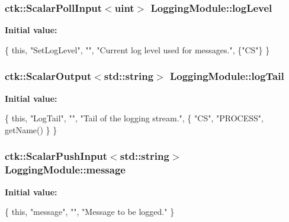 \subsubsection[{\texorpdfstring{log\+Level}{logLevel}}]{\setlength{\rightskip}{0pt plus 5cm}ctk\+::\+Scalar\+Poll\+Input$<$uint$>$ Logging\+Module\+::log\+Level}\hypertarget{structLoggingModule_a73312a5a93ca0d7ef9e90c02c3dd33b4}{}\label{structLoggingModule_a73312a5a93ca0d7ef9e90c02c3dd33b4}
{\bfseries Initial value\+:}
\begin{DoxyCode}
\{ \textcolor{keyword}{this}, \textcolor{stringliteral}{"SetLogLevel"}, \textcolor{stringliteral}{""},
      \textcolor{stringliteral}{"Current log level used for messages."}, \{\textcolor{stringliteral}{"CS"}\} \}
\end{DoxyCode}
\subsubsection[{\texorpdfstring{log\+Tail}{logTail}}]{\setlength{\rightskip}{0pt plus 5cm}ctk\+::\+Scalar\+Output$<$std\+::string$>$ Logging\+Module\+::log\+Tail}\hypertarget{structLoggingModule_a454442d06a719179e5719978d5ca26d4}{}\label{structLoggingModule_a454442d06a719179e5719978d5ca26d4}
{\bfseries Initial value\+:}
\begin{DoxyCode}
\{ \textcolor{keyword}{this}, \textcolor{stringliteral}{"LogTail"}, \textcolor{stringliteral}{""}, \textcolor{stringliteral}{"Tail of the logging stream."},
      \{ \textcolor{stringliteral}{"CS"}, \textcolor{stringliteral}{"PROCESS"}, getName() \} \}
\end{DoxyCode}
\subsubsection[{\texorpdfstring{message}{message}}]{\setlength{\rightskip}{0pt plus 5cm}ctk\+::\+Scalar\+Push\+Input$<$std\+::string$>$ Logging\+Module\+::message}\hypertarget{structLoggingModule_a887b82c4a2fbe084b134c5a91da7cf89}{}\label{structLoggingModule_a887b82c4a2fbe084b134c5a91da7cf89}
{\bfseries Initial value\+:}
\begin{DoxyCode}
\{ \textcolor{keyword}{this}, \textcolor{stringliteral}{"message"}, \textcolor{stringliteral}{""},
      \textcolor{stringliteral}{"Message to be logged."} \}
\end{DoxyCode}
